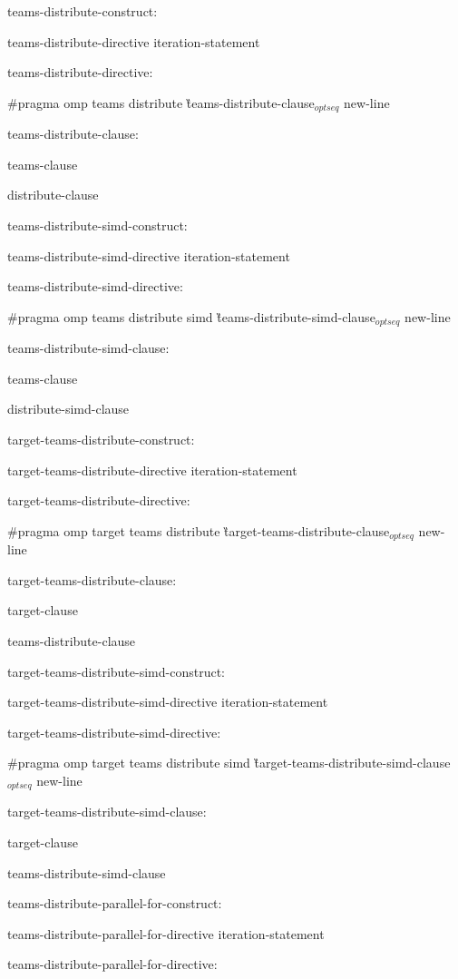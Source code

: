 {\I teams-distribute-construct:

\I\I teams-distribute-directive iteration-statement

\I teams-distribute-directive:

\C\I\I \#pragma omp teams distribute \G teams-distribute-clause$_{optseq}$ new-line

\I teams-distribute-clause:

\I\I teams-clause

\I\I distribute-clause

\I teams-distribute-simd-construct:

\I\I teams-distribute-simd-directive iteration-statement

\I teams-distribute-simd-directive:

\C\I \#pragma omp teams distribute simd \G teams-distribute-simd-clause$_{optseq}$ new-line

\I teams-distribute-simd-clause:

\I\I teams-clause

\I\I distribute-simd-clause

\I target-teams-distribute-construct:

\I\I target-teams-distribute-directive iteration-statement

\I target-teams-distribute-directive:

\C\I\I \#pragma omp target teams distribute \G target-teams-distribute-clause$_{optseq}$ new-line

\I target-teams-distribute-clause:

\I\I target-clause

\I\I teams-distribute-clause

\I target-teams-distribute-simd-construct:

\I\I target-teams-distribute-simd-directive iteration-statement

\I target-teams-distribute-simd-directive:

\C \I\I \#pragma omp target teams distribute simd \G target-teams-distribute-simd-clause$_{optseq}$ new-line

\I target-teams-distribute-simd-clause:

\I\I target-clause

\I\I teams-distribute-simd-clause

\I teams-distribute-parallel-for-construct:

\I\I teams-distribute-parallel-for-directive iteration-statement

\I teams-distribute-parallel-for-directive:

}
